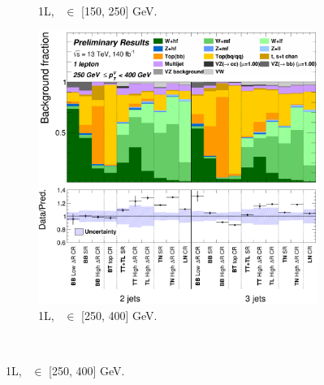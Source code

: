 \begin{figure}[h!]
{\begin{subfigure}[b]{0.38\textwidth}
            \caption{1L, \ptv\ $\in$ [150, 250] GeV.}
            \label{fig:backCom_1L_2}
        \end{subfigure}
        \begin{subfigure}[b]{0.38\textwidth}
        \centering
        \includegraphics[width=\textwidth]{Images/VH/Own_fit/backCom_uncPrefit/GlobalFit_unconditional__Prefit/C_SRCRs_L1_BMax400_BMin250.png}
        \caption{1L, \ptv\ $\in$ [250, 400] GeV.}
        \label{fig:backCom_1L_3}
        \end{subfigure} 
    }   \\
\end{figure}
